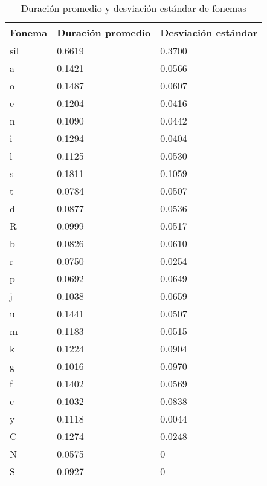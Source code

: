 \begin{table}[H]
\centering
\caption{Duración promedio y desviación estándar de fonemas}
\label{tab:duracion_promedio_fonemas}
\begin{tabular}{|l|l|l|}
\hline
\textbf{Fonema} &\multicolumn{1}{|p{2.2cm}|}{\textbf{Duración promedio}} & \multicolumn{1}{|p{2.2cm}|}{\textbf{Desviación estándar}} \\ \hline
sil & 0.6619 & 0.3700 \\ \hline
a   & 0.1421 & 0.0566 \\ \hline
o   & 0.1487 & 0.0607 \\ \hline
e   & 0.1204 & 0.0416 \\ \hline
n   & 0.1090 & 0.0442 \\ \hline
i   & 0.1294 & 0.0404 \\ \hline
l   & 0.1125 & 0.0530 \\ \hline
s   & 0.1811 & 0.1059 \\ \hline
t   & 0.0784 & 0.0507 \\ \hline
d   & 0.0877 & 0.0536 \\ \hline
R   & 0.0999 & 0.0517 \\ \hline
b   & 0.0826 & 0.0610 \\ \hline
r   & 0.0750 & 0.0254 \\ \hline
p   & 0.0692 & 0.0649 \\ \hline
j   & 0.1038 & 0.0659 \\ \hline
u   & 0.1441 & 0.0507 \\ \hline
m   & 0.1183 & 0.0515 \\ \hline
k   & 0.1224 & 0.0904 \\ \hline
g   & 0.1016 & 0.0970 \\ \hline
f   & 0.1402 & 0.0569  \\ \hline
c   & 0.1032 & 0.0838  \\ \hline
y   & 0.1118 & 0.0044  \\ \hline
C   & 0.1274 & 0.0248  \\ \hline
N   & 0.0575 & 0  \\ \hline
S   & 0.0927 & 0  \\ \hline
\end{tabular}
\end{table}